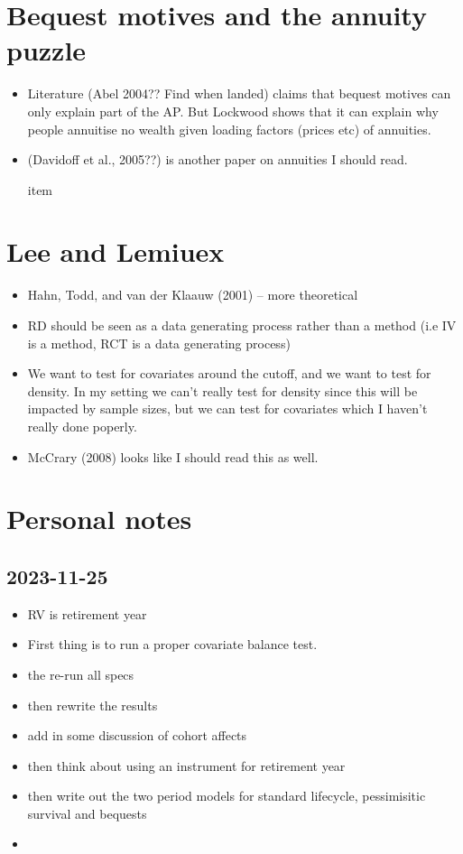 \documentclass[12pt]{article}
\begin{document}
\section{Bequest motives and the annuity puzzle}
\begin{itemize}
      \item Literature (Abel 2004?? Find when landed) claims that bequest
            motives can only explain part of the AP. But Lockwood shows that it
            can explain why people annuitise no wealth given loading factors
            (prices etc) of annuities.

      \item  (Davidoff et al., 2005??) is another paper on annuities I should
            read.

            item
\end{itemize}

\section{Lee and Lemiuex}
\begin{itemize}
      \item Hahn, Todd, and van der Klaauw (2001) -- more theoretical
      \item RD should be seen as a data generating process rather than a method
            (i.e IV is a method, RCT is a data generating process)


      \item We want to test for covariates around the cutoff, and we want to
            test for density. In my setting we can't really test for density since
            this will be impacted by sample sizes, but we can test for
            covariates which I haven't really done poperly.

      \item McCrary (2008) looks like I should read this as well.
\end{itemize}



\section{Personal notes}
\subsection{2023-11-25}
\begin{itemize}
      \item RV is retirement year
      \item First thing is to run a proper covariate balance test.
      \item the re-run all specs
      \item then rewrite the results
      \item add in some discussion of cohort affects
      \item then think about using an instrument for retirement year
      \item then write out the two period models for standard lifecycle,
            pessimisitic survival and bequests
      \item
\end{itemize}
\end{document}

